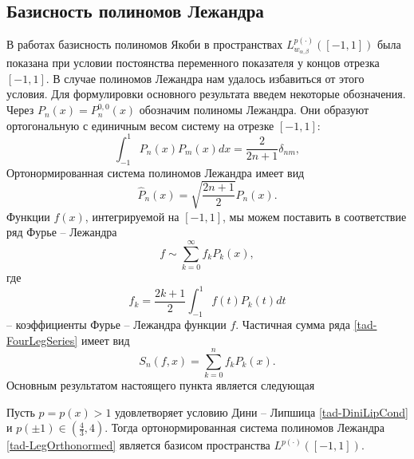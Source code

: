\subsection{Базисность полиномов Лежандра}
В работах \cite{tad-SHII-Leg,tad-SHII-Jacob,tad-SHII-Ult,tad-RAM-Jacob} базисность полиномов Якоби в пространствах $L^{p(\cdot)}_{w_{\alpha,\beta}}([-1,1])$ была показана при условии постоянства переменного показателя у концов отрезка $[-1,1]$. В случае полиномов Лежандра нам удалось избавиться от этого условия. Для формулировки основного результата введем некоторые обозначения. Через $P_n(x)=P^{0,0}_n(x)$ обозначим полиномы Лежандра.
Они образуют ортогональную с единичным весом систему на отрезке $[-1,1]$:
\begin{equation*}
  \int_{-1}^1P_n(x)P_m(x)dx=\frac{2}{2n+1}\delta_{nm},
\end{equation*}
Ортонормированная система полиномов Лежандра имеет вид
\begin{equation}\label{tad-LegOrthonormed}
  \hat{P}_n(x)=\sqrt{\frac{2n+1}{2}}P_n(x).
\end{equation}
Функции $f(x)$, интегрируемой на $[-1,1]$, мы можем поставить в соответствие ряд Фурье -- Лежандра
\begin{equation}\label{tad-FourLegSeries}
  f\sim\sum_{k=0}^\infty f_kP_k(x),
\end{equation}
где
\begin{equation*}
  f_k=\frac{2k+1}{2}\int_{-1}^1f(t)P_k(t)dt
\end{equation*}
-- коэффициенты Фурье -- Лежандра функции $f$. Частичная сумма ряда \eqref{tad-FourLegSeries} имеет вид
\begin{equation*}
  S_n(f,x)=\sum_{k=0}^n f_kP_k(x).
\end{equation*}
Основным результатом настоящего пункта является следующая
\begin{theorem}\label{tad-Th1}
	Пусть $p=p(x)>1$ удовлетворяет условию Дини -- Липшица \eqref{tad-DiniLipCond} и $p(\pm1)\in(\frac43,4)$. Тогда ортонормированная система полиномов Лежандра \eqref{tad-LegOrthonormed} является базисом пространства $L^{p(\cdot)}([-1,1])$.
\end{theorem}

